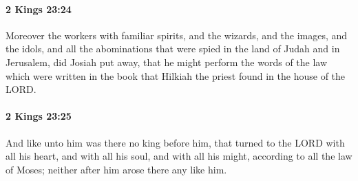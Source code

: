 		\paragraph{2 Kings 23:24} %
			\label{2KINGS-23-24}

			Moreover the workers with familiar spirits, and the wizards, and the images, and the idols, and all the abominations that were spied in the land of Judah and in Jerusalem, did Josiah put away, that he might perform the words of the law which were written in the book that Hilkiah the priest found in the house of the LORD.


		\paragraph{2 Kings 23:25} %
			\label{2KINGS-23-25}

			And like unto him was there no king before him, that turned to the LORD with all his heart, and with all his soul, and with all his might, according to all the law of Moses; neither after him arose there any like him.

